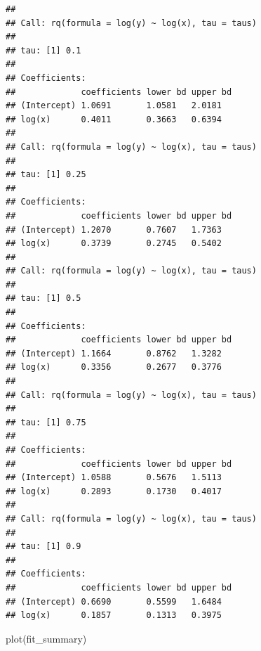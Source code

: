\documentclass{article}
\newenvironment{Shaded}{\begin{snugshade}}{\end{snugshade}}
\newcommand{\AttributeTok}[1]{\textcolor[rgb]{0.77,0.63,0.00}{#1}}
\newcommand{\CommentTok}[1]{\textcolor[rgb]{0.56,0.35,0.01}{\textit{#1}}}
\newcommand{\FloatTok}[1]{\textcolor[rgb]{0.00,0.00,0.81}{#1}}
\newcommand{\FunctionTok}[1]{\textcolor[rgb]{0.00,0.00,0.00}{#1}}
\newcommand{\NormalTok}[1]{#1}
\newcommand{\OtherTok}[1]{\textcolor[rgb]{0.56,0.35,0.01}{#1}}
\newcommand{\SpecialCharTok}[1]{\textcolor[rgb]{0.00,0.00,0.00}{#1}}
\begin{document}
\begin{Shaded}
\end{Shaded}

\begin{verbatim}
## 
## Call: rq(formula = log(y) ~ log(x), tau = taus)
## 
## tau: [1] 0.1
## 
## Coefficients:
##             coefficients lower bd upper bd
## (Intercept) 1.0691       1.0581   2.0181  
## log(x)      0.4011       0.3663   0.6394  
## 
## Call: rq(formula = log(y) ~ log(x), tau = taus)
## 
## tau: [1] 0.25
## 
## Coefficients:
##             coefficients lower bd upper bd
## (Intercept) 1.2070       0.7607   1.7363  
## log(x)      0.3739       0.2745   0.5402  
## 
## Call: rq(formula = log(y) ~ log(x), tau = taus)
## 
## tau: [1] 0.5
## 
## Coefficients:
##             coefficients lower bd upper bd
## (Intercept) 1.1664       0.8762   1.3282  
## log(x)      0.3356       0.2677   0.3776  
## 
## Call: rq(formula = log(y) ~ log(x), tau = taus)
## 
## tau: [1] 0.75
## 
## Coefficients:
##             coefficients lower bd upper bd
## (Intercept) 1.0588       0.5676   1.5113  
## log(x)      0.2893       0.1730   0.4017  
## 
## Call: rq(formula = log(y) ~ log(x), tau = taus)
## 
## tau: [1] 0.9
## 
## Coefficients:
##             coefficients lower bd upper bd
## (Intercept) 0.6690       0.5599   1.6484  
## log(x)      0.1857       0.1313   0.3975
\end{verbatim}

\begin{Shaded}
\begin{Highlighting}[]
\FunctionTok{plot}\NormalTok{(fit\_summary)}
\end{Highlighting}
\end{Shaded}
\end{document}
